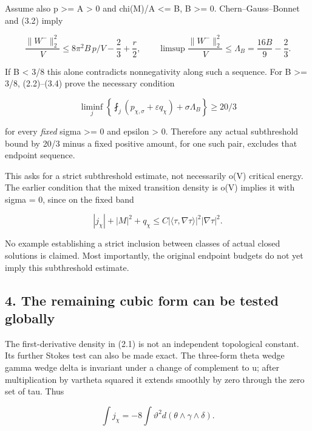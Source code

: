 \documentclass[
  10pt,
]{article}
\begin{document}
Assume also p \textgreater= A \textgreater{} 0 and chi(M)/A \textless=
B, B \textgreater= 0. Chern--Gauss--Bonnet and (3.2) imply

\[
 \frac{\|W^-\|_2^2}{V}
 \le8\pi^2B\,p/V-\frac23+\frac r2,\qquad
 \limsup\frac{\|W^-\|_2^2}{V}\le
                          \Lambda_B=\frac{16B}{9}-\frac23.     \tag{3.4}
\]

If B \textless{} 3/8 this alone contradicts nonnegativity along such a
sequence. For B \textgreater= 3/8, (2.2)--(3.4) prove the necessary
condition

\[
 \boxed{\liminf_j\left\{
     \fint_j(p_{\chi,\sigma}+\varepsilon q_\chi)
                              +\sigma\Lambda_B\right\}\ge20/3}
                                                               \tag{3.5}
\]

for every \emph{fixed} sigma \textgreater= 0 and epsilon \textgreater{}
0. Therefore any actual subthreshold bound by 20/3 minus a fixed
positive amount, for one such pair, excludes that endpoint sequence.

This asks for a strict subthreshold estimate, not necessarily o(V)
critical energy. The earlier condition that the mixed transition density
is o(V) implies it with sigma = 0, since on the fixed band

\[
 |j_\chi|+|M|^2+q_\chi
           \le C|\langle\tau,\nabla\tau\rangle|^2|\nabla\tau|^2.
\]

No example establishing a strict inclusion between classes of actual
closed solutions is claimed. Most importantly, the original endpoint
budgets do not yet imply this subthreshold estimate.

\hypertarget{the-remaining-cubic-form-can-be-tested-globally}{%
\subsection{4. The remaining cubic form can be tested
globally}\label{the-remaining-cubic-form-can-be-tested-globally}}

The first-derivative density in (2.1) is not an independent topological
constant. Its further Stokes test can also be made exact. The three-form
theta wedge gamma wedge delta is invariant under a change of complement
to u; after multiplication by vartheta squared it extends smoothly by
zero through the zero set of tau. Thus

\[
 \int j_\chi=-8\int\vartheta^2d(\theta\wedge\gamma\wedge\delta).
                                                               \tag{4.1}
\]
\end{document}
